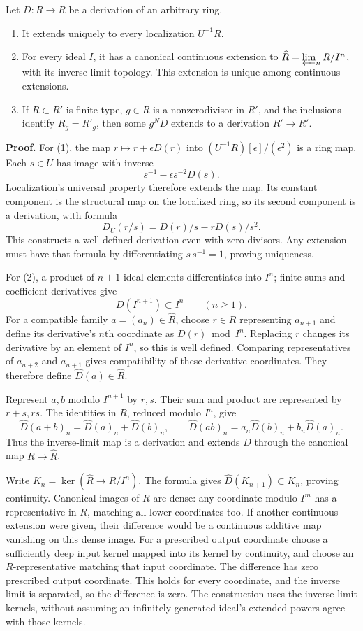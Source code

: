\documentclass[11pt,a4paper,openany]{report}
\providecommand{\tightlist}{\setlength{\itemsep}{0pt}\setlength{\parskip}{0pt}}
\begin{document}
Let \(D:R\to R\) be a derivation of an arbitrary ring.

\begin{enumerate}
\def\labelenumi{\arabic{enumi}.}
\tightlist
\item
  It extends uniquely to every localization \(U^{-1}R\).
\item
  For every ideal \(I\), it has a canonical continuous extension to \(\widehat R=\varprojlim_n R/I^n\), with its inverse-limit topology. This extension is unique among continuous extensions.
\item
  If \(R\subset R'\) is finite type, \(g\in R\) is a nonzerodivisor in \(R'\), and the inclusions identify \(R_g=R'_g\), then some \(g^ND\) extends to a derivation \(R'\to R'\).
\end{enumerate}

\textbf{Proof.} For (1), the map \(r\mapsto r+\epsilon D(r)\) into \((U^{-1}R)[\epsilon]/(\epsilon^2)\) is a ring map. Each \(s\in U\) has image with inverse \[s^{-1}-\epsilon s^{-2}D(s).\] Localization's universal property therefore extends the map. Its constant component is the structural map on the localized ring, so its second component is a derivation, with formula \[D_U(r/s)=D(r)/s-rD(s)/s^2.\] This constructs a well-defined derivation even with zero divisors. Any extension must have that formula by differentiating \(s\,s^{-1}=1\), proving uniqueness.

For (2), a product of \(n+1\) ideal elements differentiates into \(I^n\); finite sums and coefficient derivatives give \[D(I^{n+1})\subset I^n\qquad(n\ge1).\] For a compatible family \(a=(a_n)\in\widehat R\), choose \(r\in R\) representing \(a_{n+1}\) and define its derivative's \(n\)th coordinate as \(D(r)\bmod I^n\). Replacing \(r\) changes its derivative by an element of \(I^n\), so this is well defined. Comparing representatives of \(a_{n+2}\) and \(a_{n+1}\) gives compatibility of these derivative coordinates. They therefore define \(\widehat D(a)\in\widehat R\).

Represent \(a,b\) modulo \(I^{n+1}\) by \(r,s\). Their sum and product are represented by \(r+s,rs\). The identities in \(R\), reduced modulo \(I^n\), give \[
\widehat D(a+b)_n=\widehat D(a)_n+\widehat D(b)_n,\qquad
\widehat D(ab)_n=a_n\widehat D(b)_n+b_n\widehat D(a)_n.
\] Thus the inverse-limit map is a derivation and extends \(D\) through the canonical map \(R\to\widehat R\).

Write \(K_n=\ker(\widehat R\to R/I^n)\). The formula gives \(\widehat D(K_{n+1})\subset K_n\), proving continuity. Canonical images of \(R\) are dense: any coordinate modulo \(I^m\) has a representative in \(R\), matching all lower coordinates too. If another continuous extension were given, their difference would be a continuous additive map vanishing on this dense image. For a prescribed output coordinate choose a sufficiently deep input kernel mapped into its kernel by continuity, and choose an \(R\)-representative matching that input coordinate. The difference has zero prescribed output coordinate. This holds for every coordinate, and the inverse limit is separated, so the difference is zero. The construction uses the inverse-limit kernels, without assuming an infinitely generated ideal's extended powers agree with those kernels.
\end{document}
